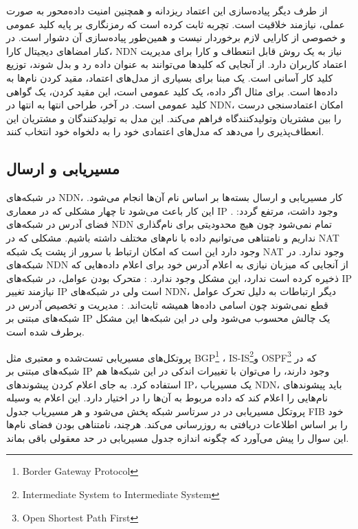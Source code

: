  از طرف دیگر پیاده‌سازی این اعتماد ریزدانه و همچنین امنیت داده‌محور به صورت عملی، نیازمند خلاقیت است.  تچربه ثابت کرده است که رمزنگاری بر پایه کلید عمومی و خصوصی از کارایی لازم برخوردار نیست و همین‌طور پیاده‌سازی آن دشوار است. در کنار امضاهای دیجیتال کارا، NDN نیاز به یک روش قابل انتعطاف و کارا برای مدیریت اعتماد کاربران دارد. از‌ آنجایی که کلیدها می‌توانند به عنوان داده رد و بدل شوند، توزیع کلید کار آسانی است. 
یک مبنا برای بسیاری از مدل‌های اعتماد، مقید کردن نام‌ها به داده‌ها  است. برای مثال اگر داده، یک کلید عمومی است،  این مقید کردن، یک گواهی کلید عمومی است. در آخر، طراحی انتها به انتها در NDN، امکان اعتمادسنجی درست را بین مشتریان وتولیدکنندگاه فراهم می‌کند. این مدل به تولیدکنندگان و مشتریان این انعطاف‌پذیری را می‌دهد که مدل‌های اعتمادی خود را به دلخواه خود انتخاب کنند. 


\subsection{مسیریابی و ارسال}
در شبکه‌های NDN، کار مسیریابی و ارسال بسته‌ها بر اساس نام آن‌ها انجام می‌شود. این کار باعث می‌شود تا چهار مشکلی که در معماری IP وجود داشت، مرتفع گردد:‌ 
 . فضای آدرس در شبکه‌های NDN تمام نمی‌شود چون هیچ محدودیتی برای نام‌گذاری نداریم و نامتناهی می‌توانیم داده با نام‌های مختلف داشته باشیم. 
  
مشکلی که در NAT وجود دارد این است که امکان ارتباط با سرور از پشت یک شبکه NAT وجود ندارد. در شبکه‌های NDN از آنجایی که میزبان نیازی به اعلام آدرس خود برای اعلام داده‌هایی که ذخیره کرده است ندارد، این مشکل وجود ندارد.  
 : متحرک بودن عوامل، در شبکه‌های IP نیازمند تغییر IP است ولی در شبکه‌های NDN، دیگر ارتباطات به دلیل تحرک عوامل قطع نمی‌شوند چون اسامی داده‌ها همیشه ثابت‌اند. 
 :‌ مدیریت و تخصیص آدرس در شبکه‌های مبتنی بر IP یک چالش محسوب می‌شود ولی در این شبکه‌ها این مشکل برطرف شده است. 

پروتکل‌های مسیریابی تست‌شده و معتبری مثل BGP\footnote{Border Gateway Protocol} ،
IS-IS\footnote{Intermediate System to Intermediate System}و 
OSPF\footnote{Open Shortest Path First}
که در شبکه‌های مبتنی بر IP وجود دارند، را می‌توان با تغییرات اندکی در این شبکه‌ها هم استفاده کرد. به جای اعلام کردن پیشوندهای IP، یک مسیریاب NDN، باید پیشوندهای نام‌هایی را اعلام کند که داده مربوط به آن‌ها را در اختیار دارد. 
این اعلام به وسیله پروتکل مسیریابی در در سرتاسر شبکه پخش می‌شود و هر مسیریاب جدول FIB خود را بر اساس اطلاعات دریافتی به روزرسانی می‌کند. هرچند، نامتناهی بودن فضای نام‌ها این سوال را پیش می‌آورد که چگونه اندازه جدول مسیریابی در حد معقولی باقی بماند. 

